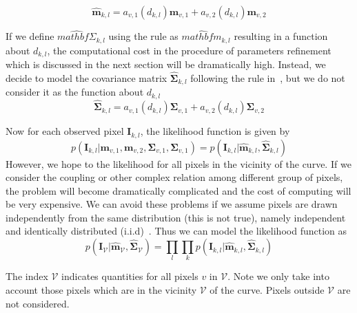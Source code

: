   \begin{equation}
    \label{eq:5.17}
    \hat{\mathbf{m}}_{k,l} = a_{v,1}(d_{k,l})\mathbf{m}_{v,1} + a_{v,2}(d_{k,l})\mathbf{m}_{v,2}
  \end{equation}

If we define  $\hat{mathbf{\Sigma}}_{k,l}$ using the rule as
$\hat{mathbf{m}}_{k,l}$ resulting in a function about $d_{k,l}$, the computational cost in the procedure of
parameters refinement which is discussed in the next section  will be dramatically high. Instead, we decide to
model the covariance matrix $\hat{\mathbf{\Sigma}}_{k,l}$ following the
rule in~\cite{hanek2004fitting}, but we do not consider it as the function about $d_{k,l}$
\begin{equation}
  \label{eq:5.18}
  \hat{\mathbf{\mathbf{\Sigma}}}_{k,l} = a_{v,1}(d_{k,l})\mathbf{\Sigma}_{v,1} + a_{v,2}(d_{k,l})\mathbf{\Sigma}_{v,2}
\end{equation}

Now for each observed pixel $\mathbf{I}_{k,l}$, the likelihood
function is given by
\begin{equation}
  \label{eq:5.19}
p(\mathbf{I}_{k,l} | \mathbf{m}_{v,1}, \mathbf{m}_{v,2},
  \mathbf{\Sigma}_{v,1}, \mathbf{\Sigma}_{v,1}) = p(\mathbf{I}_{k,l} | \hat{\mathbf{\mathbf{m}}}_{k,l},\hat{\mathbf{\mathbf{\Sigma}}}_{k,l}) 
\end{equation}
However, we hope to the likelihood for all pixels in the vicinity of
the curve. If we consider the coupling or other complex relation among
different group of pixels, the problem will become dramatically
complicated and the cost of computing will be very expensive. We can
avoid these problems if we assume pixels are drawn independently from the same distribution
(this is not true), namely independent and identically distributed
(i.i.d)~\cite{bishop2006pattern}. Thus we can model the likelihood function as
\begin{equation}
  \label{eq:5.20}
  p(\mathbf{I}_{\mathcal{V}} |
  \hat{\mathbf{\mathbf{m}}}_{\mathcal{V}},\hat{\mathbf{\mathbf{\Sigma}}}_{\mathcal{V}})
  = \prod_l \prod_k p(\mathbf{I}_{k,l} | \hat{\mathbf{\mathbf{m}}}_{k,l},\hat{\mathbf{\mathbf{\Sigma}}}_{k,l}) 
\end{equation}

The index $\mathcal{V}$ indicates quantities for all pixels $v$ in
$\mathcal{V}$. Note we only take into account those pixels which are
in the vicinity $\mathcal{V}$ of the curve. Pixels outside
$\mathcal{V}$ are not considered.

